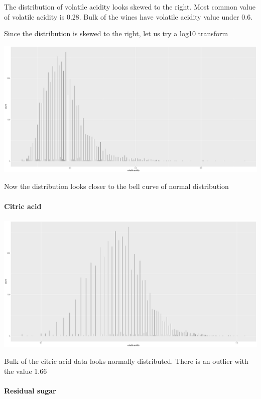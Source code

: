 \documentclass[]{article}
\let\oldparagraph\paragraph
\renewcommand{\paragraph}[1]{\oldparagraph{#1}\mbox{}}
\begin{document}
The distribution of volatile acidity looks skewed to the right. Most
common value of volatile acidity is 0.28. Bulk of the wines have
volatile acidity value under 0.6.

Since the distribution is skewed to the right, let us try a log10
transform

\includegraphics{White_wine_quality_files/figure-latex/unnamed-chunk-7-1.pdf}

Now the distribution looks closer to the bell curve of normal
distribution

\paragraph{Citric acid}\label{citric-acid}

\includegraphics{White_wine_quality_files/figure-latex/unnamed-chunk-8-1.pdf}

Bulk of the citric acid data looks normally distributed. There is an
outlier with the value 1.66

\paragraph{Residual sugar}\label{residual-sugar}
\end{document}
